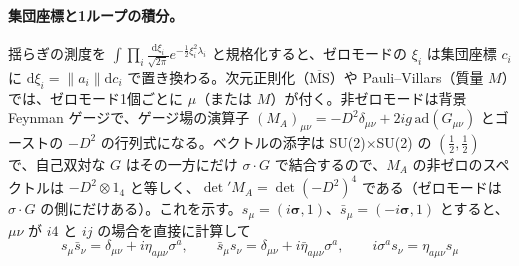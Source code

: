\documentclass[a4paper,10pt]{ltjsarticle}
\newcommand{\dd}{\mathrm{d}}
\newcommand{\MSbar}{\overline{\mathrm{MS}}}
\begin{document}
\paragraph{集団座標と1ループの積分。}揺らぎの測度を $\int\prod_i\frac{\dd\xi_i}{\sqrt{2\pi}}e^{-\frac12\xi_i^2\lambda_i}$ と規格化すると、ゼロモードの $\xi_i$ は集団座標 $c_i$ に $\dd\xi_i=\|a_i\|\dd c_i$ で置き換わる。次元正則化（$\MSbar$）や Pauli--Villars（質量 $M$）では、ゼロモード1個ごとに $\mu$（または $M$）が付く。非ゼロモードは背景 Feynman ゲージで、ゲージ場の演算子 $(M_A)_{\mu\nu}=-D^2\delta_{\mu\nu}+2ig\,\mathrm{ad}(G_{\mu\nu})$ とゴーストの $-D^2$ の行列式になる。ベクトルの添字は SU(2)$\times$SU(2) の $(\frac12,\frac12)$ で、自己双対な $G$ はその一方にだけ $\sigma\cdot G$ で結合するので、$M_A$ の非ゼロのスペクトルは $-D^2\otimes1_4$ と等しく、$\det'M_A=\det(-D^2)^4$ である（ゼロモードは $\sigma\cdot G$ の側にだけある）。これを示す。$s_\mu=(i\boldsymbol\sigma,1)$、$\bar s_\mu=(-i\boldsymbol\sigma,1)$ とすると、$\mu\nu$ が $i4$ と $ij$ の場合を直接に計算して
\begin{equation*}
s_\mu\bar s_\nu=\delta_{\mu\nu}+i\eta_{a\mu\nu}\sigma^a,\qquad \bar s_\mu s_\nu=\delta_{\mu\nu}+i\bar\eta_{a\mu\nu}\sigma^a,\qquad i\sigma^as_\nu=\eta_{a\mu\nu}s_\mu
\end{equation*}
\end{document}
